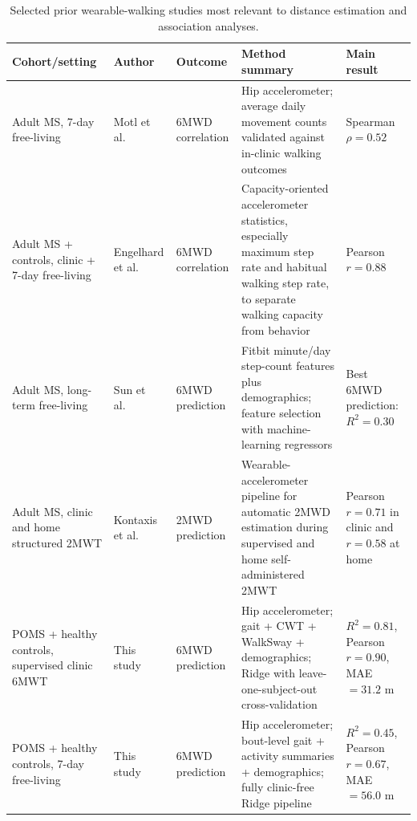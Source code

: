 \documentclass{article}
\begin{document}
\begin{table}[!t]
\centering
\caption{Selected prior wearable-walking studies most relevant to distance estimation and association analyses.}
\label{tab:discussion_comparison}
\small
\begin{threeparttable}
\begin{tabularx}{\linewidth}{@{}>{\raggedright\arraybackslash}p{2cm}>{\raggedright\arraybackslash}p{2cm}>{\raggedright\arraybackslash}p{1.6cm}>{\raggedright\arraybackslash}X>{\raggedright\arraybackslash}p{2.5cm}@{}}
\toprule
Cohort/setting & Author & Outcome & Method summary & Main result \\
\midrule
Adult MS, 7-day free-living
& Motl et al.~\cite{motl2011accelerometry}
& 6MWD correlation
& Hip accelerometer; average daily movement counts validated against in-clinic walking outcomes
& Spearman $\rho = 0.52$ \\
\midrule
Adult MS + controls, clinic + 7-day free-living
& Engelhard et al.~\cite{Engelhard2018RealWorld}
& 6MWD correlation
& Capacity-oriented accelerometer statistics, especially maximum step rate and habitual walking step rate, to separate walking capacity from behavior
& Pearson $r = 0.88$ \\
\midrule
Adult MS, long-term free-living
& Sun et al.~\cite{Sun2022Utility}
& 6MWD prediction
& Fitbit minute/day step-count features plus demographics; feature selection with machine-learning regressors
& Best 6MWD prediction: $R^2 = 0.30$ \\
\midrule
Adult MS, clinic and home structured 2MWT
& Kontaxis et al.~\cite{Kontaxis2023Automatic}
& 2MWD prediction
& Wearable-accelerometer pipeline for automatic 2MWD estimation during supervised and home self-administered 2MWT
& Pearson $r = 0.71$ in clinic and $r = 0.58$ at home \\
\midrule
POMS + healthy controls, supervised clinic 6MWT
& This study
& 6MWD prediction 
& Hip accelerometer; gait + CWT + WalkSway + demographics; Ridge with leave-one-subject-out cross-validation
& $R^2 = 0.81$, Pearson $r = 0.90$, MAE $= 31.2$ m \\
\midrule
POMS + healthy controls, 7-day free-living
& This study
& 6MWD prediction 
& Hip accelerometer; bout-level gait + activity summaries + demographics; fully clinic-free Ridge pipeline
& $R^2 = 0.45$, Pearson $r = 0.67$, MAE $= 56.0$ m \\
\bottomrule
\end{tabularx}
\end{threeparttable}
\end{table}
\end{document}
